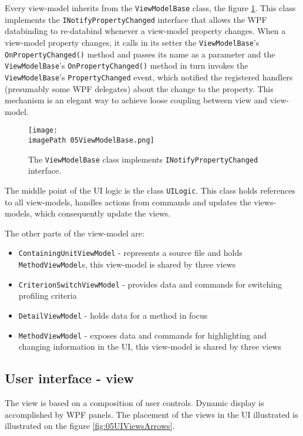 Every view-model inherits from the \texttt{ViewModelBase} class, the figure \ref{fig:05ViewModelBase}. This class implements the \texttt{INotifyPropertyChanged} interface that allows the WPF databinding to re-databind whenever a view-model property changes. When a view-model property changes, it calls in its setter the \texttt{ViewModelBase}'s \texttt{OnPropertyChanged()} method and passes its name as a parameter and the \texttt{ViewModelBase}'s \texttt{OnPropertyChanged()} method in turn invokes the \texttt{ViewModelBase}'s \texttt{PropertyChanged} event, which notified the registered handlers (presumably some WPF delegates) about the change to the property. This mechanism is an elegant way to achieve loose coupling between view and view-model.
 
 \begin{figure}
	\centering
		\texttt{[image: \\imagePath 05ViewModelBase.png]}
		\caption{The \texttt{ViewModelBase} class implements \texttt{INotifyPropertyChanged} interface.}
	\label{fig:05ViewModelBase}
\end{figure}

The middle point of the UI logic is the class \texttt{UILogic}. This class holds references to all view-models, handles actions from commands and updates the views-models, which consequently update the views.

The other parts of the view-model are:
\begin{itemize}	
\item  \texttt{ContainingUnitViewModel} - represents a source file and holds \texttt{MethodViewModel}s, this view-model is shared by three views	

\item \texttt{CriterionSwitchViewModel} - provides data and commands for switching profiling criteria

\item \texttt{DetailViewModel} - holds data for a method in focus

\item \texttt{MethodViewModel} - exposes data and commands for highlighting and changing information in the UI, this view-model is shared by three views	
\end{itemize}


\subsection{User interface - view}
The view is based on a composition of user controls. Dynamic display is accomplished by WPF panels. The placement of the views in the UI illustrated is illustrated on the figure \ref{fig:05UIViewsArrows}. 

